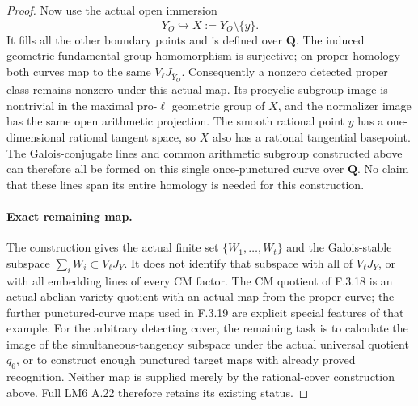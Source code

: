 \begin{proof}
Now use the actual open immersion
\[
             Y_O\hookrightarrow
             X:=\overline Y_O\setminus\{y\}.
\]
It fills all the other boundary points and is defined
over $\mathbf Q$. The induced geometric fundamental-group
homomorphism is surjective; on proper homology both
curves map to the same $V_\ell J_{\overline Y_O}$.
Consequently a nonzero detected proper class remains
nonzero under this actual map. Its procyclic subgroup
image is nontrivial in the maximal pro-$\ell$ geometric
group of $X$, and the normalizer image has the same
open arithmetic projection. The smooth rational point
$y$ has a one-dimensional rational tangent space, so
$X$ also has a rational tangential basepoint. The
Galois-conjugate lines and common arithmetic subgroup
constructed above can therefore all be formed on this
single once-punctured curve over $\mathbf Q$.
No claim that these lines span its entire homology is
needed for this construction.

\paragraph{Exact remaining map.}
The construction gives the actual finite set
$\{W_1,\ldots,W_t\}$ and the Galois-stable subspace
$\sum_iW_i\subset V_\ell J_Y$. It does not identify that
subspace with all of $V_\ell J_Y$, or with all embedding
lines of every CM factor. The CM quotient of F.3.18 is an
actual abelian-variety quotient with an actual map from
the proper curve; the further punctured-curve maps used
in F.3.19 are explicit special features of that example.
For the arbitrary detecting cover, the remaining task is
to calculate the image of the simultaneous-tangency
subspace under the actual universal quotient $q_6$, or to
construct enough punctured target maps with already
proved recognition. Neither map is supplied merely by
the rational-cover construction above. Full LM6 A.22
therefore retains its existing status.

\end{proof}

